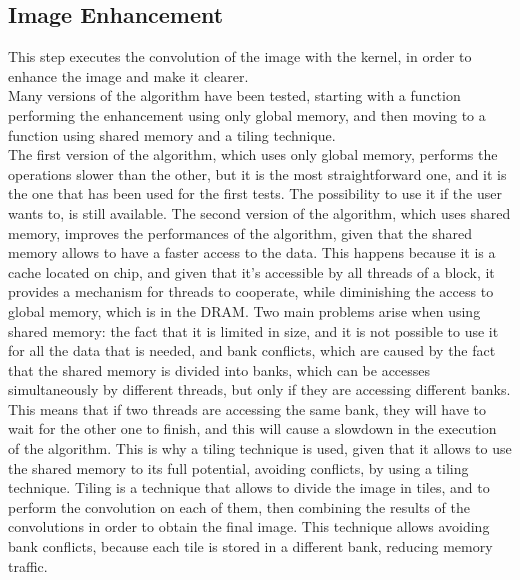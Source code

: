     \subsection{Image Enhancement}

    This step executes the convolution of the image with the kernel, in order to enhance the image and make it clearer.\\
    Many versions of the algorithm have been tested, starting with a function performing the enhancement using only global memory,
    and then moving to a function using shared memory and a tiling technique.\\
    The first version of the algorithm, which uses only global memory, performs the operations slower than the other,
    but it is the most straightforward one, and it is the one that has been used for the first tests. The possibility to use it if the user
    wants to, is still available. The second version of the algorithm, which uses shared memory, improves the performances of the algorithm, given that the shared memory
    allows to have a faster access to the data. This happens because it is a cache located on chip, and given that it's accessible by all threads of a block,
    it provides a mechanism for threads to cooperate, while diminishing the access to global memory, which is in the DRAM.
    Two main problems arise when using shared memory: the fact that it is limited in size, and it is not possible to use it for all the data that is needed, 
    and bank conflicts, which are caused by the fact that the shared memory is divided into banks, which can be accesses simultaneously by different threads,
    but only if they are accessing different banks. This means that if two threads are accessing the same bank, they will have to wait for the other one to finish,
    and this will cause a slowdown in the execution of the algorithm.
    This is why a tiling technique is used, given that it allows to use the shared memory to its full potential, avoiding conflicts, by using a tiling technique.
    Tiling is a technique that allows to divide the image in tiles, and to perform the convolution on each of them, then combining the results
    of the convolutions in order to obtain the final image. This technique allows avoiding bank conflicts, because each tile is stored in a different
    bank, reducing memory traffic.
    
